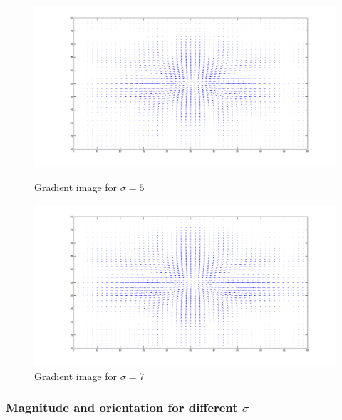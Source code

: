 \documentclass[a4paper,10pt]{article}
\begin{document}
\begin{figure}[ht]
\begin{minipage}[b]{0.45\linewidth}
\centering
\includegraphics[width=\textwidth]{quiver_sigma5}
\caption{Gradient image for $\sigma=5$}
\end{minipage}
\hspace{0.1cm}
\begin{minipage}[b]{0.45\linewidth}
\centering
\includegraphics[width=\textwidth]{quiver_sigma7}
\caption{Gradient image for $\sigma=7$}
\end{minipage}
\end{figure}

\subsubsection{Magnitude and orientation for different $\sigma$}
\end{document}
